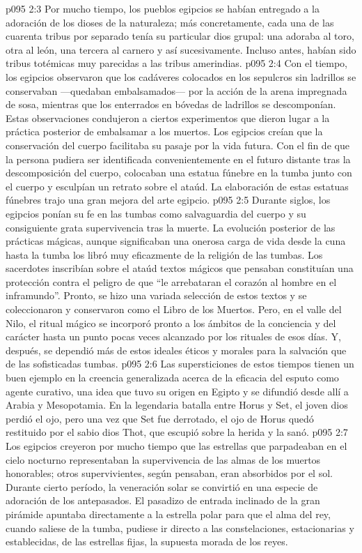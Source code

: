 \vs p095 2:3 Por mucho tiempo, los pueblos egipcios se habían entregado a la adoración de los dioses de la naturaleza; más concretamente, cada una de las cuarenta tribus por separado tenía su particular dios grupal: una adoraba al toro, otra al león, una tercera al carnero y así sucesivamente. Incluso antes, habían sido tribus totémicas muy parecidas a las tribus amerindias.
\vs p095 2:4 \pc Con el tiempo, los egipcios observaron que los cadáveres colocados en los sepulcros sin ladrillos se conservaban ---quedaban embalsamados--- por la acción de la arena impregnada de sosa, mientras que los enterrados en bóvedas de ladrillos se descomponían. Estas observaciones condujeron a ciertos experimentos que dieron lugar a la práctica posterior de embalsamar a los muertos. Los egipcios creían que la conservación del cuerpo facilitaba su pasaje por la vida futura. Con el fin de que la persona pudiera ser identificada convenientemente en el futuro distante tras la descomposición del cuerpo, colocaban una estatua fúnebre en la tumba junto con el cuerpo y esculpían un retrato sobre el ataúd. La elaboración de estas estatuas fúnebres trajo una gran mejora del arte egipcio.
\vs p095 2:5 Durante siglos, los egipcios ponían su fe en las tumbas como salvaguardia del cuerpo y su consiguiente grata supervivencia tras la muerte. La evolución posterior de las prácticas mágicas, aunque significaban una onerosa carga de vida desde la cuna hasta la tumba los libró muy eficazmente de la religión de las tumbas. Los sacerdotes inscribían sobre el ataúd textos mágicos que pensaban constituían una protección contra el peligro de que “le arrebataran el corazón al hombre en el inframundo”. Pronto, se hizo una variada selección de estos textos y se coleccionaron y conservaron como el Libro de los Muertos. Pero, en el valle del Nilo, el ritual mágico se incorporó pronto a los ámbitos de la conciencia y del carácter hasta un punto pocas veces alcanzado por los rituales de esos días. Y, después, se dependió más de estos ideales éticos y morales para la salvación que de las sofisticadas tumbas.
\vs p095 2:6 \pc Las supersticiones de estos tiempos tienen un buen ejemplo en la creencia generalizada acerca de la eficacia del esputo como agente curativo, una idea que tuvo su origen en Egipto y se difundió desde allí a Arabia y Mesopotamia. En la legendaria batalla entre Horus y Set, el joven dios perdió el ojo, pero una vez que Set fue derrotado, el ojo de Horus quedó restituido por el sabio dios Thot, que escupió sobre la herida y la sanó.
\vs p095 2:7 \pc Los egipcios creyeron por mucho tiempo que las estrellas que parpadeaban en el cielo nocturno representaban la supervivencia de las almas de los muertos honorables; otros supervivientes, según pensaban, eran absorbidos por el sol. Durante cierto período, la veneración solar se convirtió en una especie de adoración de los antepasados. El pasadizo de entrada inclinado de la gran pirámide apuntaba directamente a la estrella polar para que el alma del rey, cuando saliese de la tumba, pudiese ir directo a las constelaciones, estacionarias y establecidas, de las estrellas fijas, la supuesta morada de los reyes.
